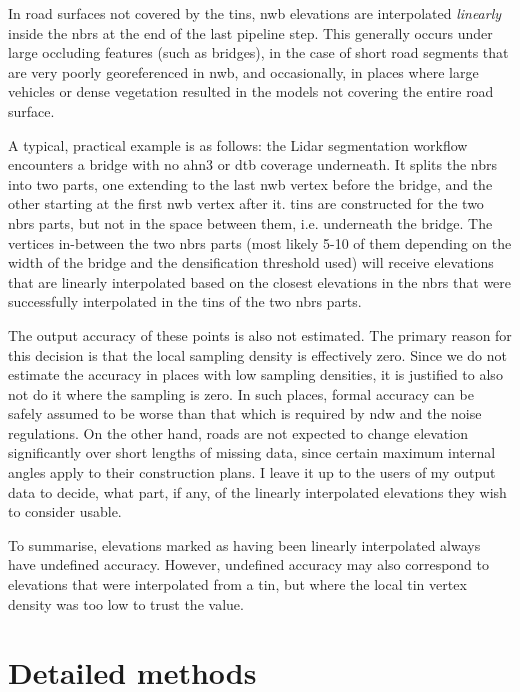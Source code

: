 In road surfaces not covered by the \ac{tin}s, \ac{nwb} elevations are interpolated \textit{linearly} inside the \ac{nbrs} at the end of the last pipeline step. This generally occurs under large occluding features (such as bridges), in the case of short road segments that are very poorly georeferenced in \ac{nwb}, and occasionally, in places where large vehicles or dense vegetation resulted in the models not covering the entire road surface.

A typical, practical example is as follows: the Lidar segmentation workflow encounters a bridge with no \ac{ahn3} or \ac{dtb} coverage underneath. It splits the \ac{nbrs} into two parts, one extending to the last \ac{nwb} vertex before the bridge, and the other starting at the first \ac{nwb} vertex after it. \ac{tin}s are constructed for the two \ac{nbrs} parts, but not in the space between them, i.e. underneath the bridge. The vertices in-between the two \ac{nbrs} parts (most likely 5-10 of them depending on the width of the bridge and the densification threshold used) will receive elevations that are linearly interpolated based on the closest elevations in the \ac{nbrs} that were successfully interpolated in the \ac{tin}s of the two \ac{nbrs} parts.

The output accuracy of these points is also not estimated. The primary reason for this decision is that the local sampling density is effectively zero. Since we do not estimate the accuracy in places with low sampling densities, it is justified to also not do it where the sampling is zero. In such places, formal accuracy can be safely assumed to be worse than that which is required by \ac{ndw} and the noise regulations. On the other hand, roads are not expected to change elevation significantly over short lengths of missing data, since certain maximum internal angles apply to their construction plans. I leave it up to the users of my output data to decide, what part, if any, of the linearly interpolated elevations they wish to consider usable.

To summarise, elevations marked as having been linearly interpolated always have undefined accuracy. However, undefined accuracy may also correspond to elevations that were interpolated from a \ac{tin}, but where the local \ac{tin} vertex density was too low to trust the value.

\section{Detailed methods}
\label{sec:methods}

